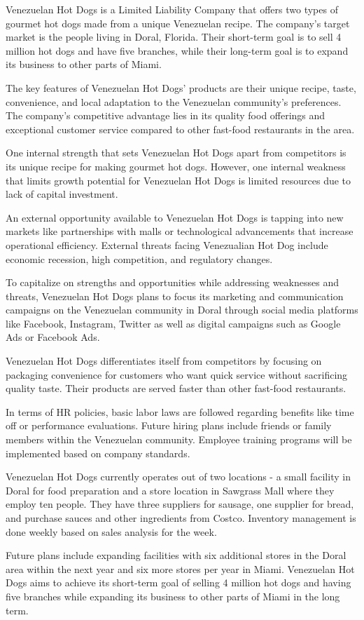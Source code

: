 Venezuelan Hot Dogs is a Limited Liability Company that offers two types of gourmet hot dogs made from a unique Venezuelan recipe. The company's target market is the people living in Doral, Florida. Their short-term goal is to sell 4 million hot dogs and have five branches, while their long-term goal is to expand its business to other parts of Miami.

The key features of Venezuelan Hot Dogs' products are their unique recipe, taste, convenience, and local adaptation to the Venezuelan community's preferences. The company's competitive advantage lies in its quality food offerings and exceptional customer service compared to other fast-food restaurants in the area.

One internal strength that sets Venezuelan Hot Dogs apart from competitors is its unique recipe for making gourmet hot dogs. However, one internal weakness that limits growth potential for Venezuelan Hot Dogs is limited resources due to lack of capital investment.

An external opportunity available to Venezuelan Hot Dogs is tapping into new markets like partnerships with malls or technological advancements that increase operational efficiency. External threats facing Venezualian Hot Dog include economic recession, high competition, and regulatory changes.

To capitalize on strengths and opportunities while addressing weaknesses and threats, Venezuelan Hot Dogs plans to focus its marketing and communication campaigns on the Venezuelan community in Doral through social media platforms like Facebook, Instagram, Twitter as well as digital campaigns such as Google Ads or Facebook Ads.

Venezuelan Hot Dogs differentiates itself from competitors by focusing on packaging convenience for customers who want quick service without sacrificing quality taste. Their products are served faster than other fast-food restaurants.

In terms of HR policies, basic labor laws are followed regarding benefits like time off or performance evaluations. Future hiring plans include friends or family members within the Venezuelan community. Employee training programs will be implemented based on company standards.

Venezuelan Hot Dogs currently operates out of two locations - a small facility in Doral for food preparation and a store location in Sawgrass Mall where they employ ten people. They have three suppliers for sausage, one supplier for bread, and purchase sauces and other ingredients from Costco. Inventory management is done weekly based on sales analysis for the week.

Future plans include expanding facilities with six additional stores in the Doral area within the next year and six more stores per year in Miami. Venezuelan Hot Dogs aims to achieve its short-term goal of selling 4 million hot dogs and having five branches while expanding its business to other parts of Miami in the long term.